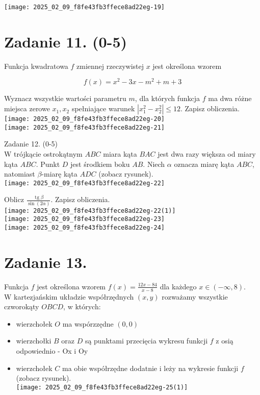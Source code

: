 \documentclass[10pt]{article}
\begin{document}
\begin{center}
\texttt{[image: 2025\_02\_09\_f8fe43fb3ffece8ad22eg-19]}
\end{center}

\section*{Zadanie 11. (0-5)}
Funkcja kwadratowa \(f\) zmiennej rzeczywistej \(x\) jest określona wzorem

\[
f(x)=x^{2}-3 x-m^{2}+m+3
\]

Wyznacz wszystkie wartości parametru \(m\), dla których funkcja \(f\) ma dwa różne miejsca zerowe \(x_{1}, x_{2}\) spełniające warunek \(\left|x_{1}^{2}-x_{2}^{2}\right| \leq 12\). Zapisz obliczenia.\\
\texttt{[image: 2025\_02\_09\_f8fe43fb3ffece8ad22eg-20]}\\
\texttt{[image: 2025\_02\_09\_f8fe43fb3ffece8ad22eg-21]}

Zadanie 12. (0-5)\\
W trójkącie ostrokątnym \(A B C\) miara kąta \(B A C\) jest dwa razy większa od miary kąta \(A B C\). Punkt \(D\) jest środkiem boku \(A B\). Niech \(\alpha\) oznacza miarę kąta \(A B C\), natomiast \(\beta\)-miarę kąta \(A D C\) (zobacz rysunek).\\
\texttt{[image: 2025\_02\_09\_f8fe43fb3ffece8ad22eg-22]}

Oblicz \(\frac{\operatorname{tg} \beta}{\sin (2 \alpha)}\). Zapisz obliczenia.\\
\texttt{[image: 2025\_02\_09\_f8fe43fb3ffece8ad22eg-22(1)]}\\
\texttt{[image: 2025\_02\_09\_f8fe43fb3ffece8ad22eg-23]}\\
\texttt{[image: 2025\_02\_09\_f8fe43fb3ffece8ad22eg-24]}

\section*{Zadanie 13.}
Funkcja \(f\) jest określona wzorem \(f(x)=\frac{12 x-84}{x-8}\) dla każdego \(x \in(-\infty, 8)\).\\
W kartezjańskim układzie współrzędnych \((x, y)\) rozważamy wszystkie czworokąty \(O B C D\), w których:

\begin{itemize}
  \item wierzchołek \(O\) ma wspórzzędne \((0,0)\)
  \item wierzchołki \(B\) oraz \(D\) są punktami przecięcia wykresu funkcji \(f\) z osią odpowiednio - Ox i Oy
  \item wierzchołek \(C\) ma obie współrzędne dodatnie i leży na wykresie funkcji \(f\) (zobacz rysunek).\\
\texttt{[image: 2025\_02\_09\_f8fe43fb3ffece8ad22eg-25(1)]}
\end{itemize}
\end{document}
